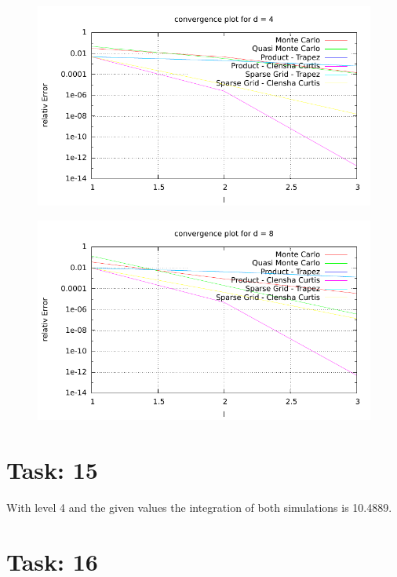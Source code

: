 \documentclass{article}
\begin{document}
\begin{figure}[htbp]
  \centering
     \includegraphics[width=1.0\textwidth]{../Task13/sh3_task13_convergencePlotd4.pdf}
\end{figure}
\newpage
\begin{figure}[htbp]
  \centering
     \includegraphics[width=1.0\textwidth]{../Task13/sh3_task13_convergencePlotd8.pdf}
\end{figure}

\section*{Task: 15}

With level 4 and the given values the integration of both simulations is 10.4889.
\newpage
\section*{Task: 16}
\end{document}
